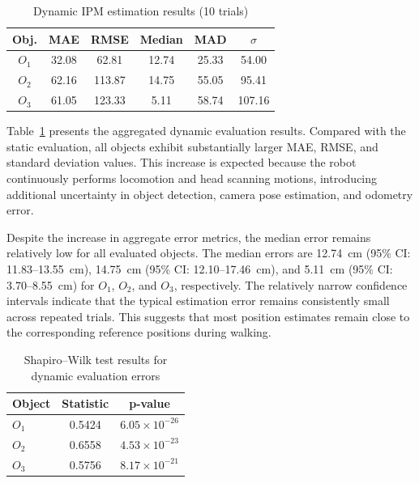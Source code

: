 \documentclass[journal]{IAENGtran}
\begin{document}
\begin{table}[h]
\centering
\footnotesize
\caption{Dynamic IPM estimation results (10 trials)}
\label{tab:dynamic_results}
\begin{tabular}{c c c c c c}
\toprule
\textbf{Obj.} &
\textbf{MAE} &
\textbf{RMSE} &
\textbf{Median} &
\textbf{MAD} &
\textbf{$\sigma$} \\
\midrule
$O_1$ & 32.08 & 62.81  & 12.74 & 25.33 & 54.00  \\
$O_2$ & 62.16 & 113.87 & 14.75 & 55.05 & 95.41  \\
$O_3$ & 61.05 & 123.33 & 5.11  & 58.74 & 107.16 \\
\bottomrule
\end{tabular}
\end{table}

Table~\ref{tab:dynamic_results} presents the aggregated dynamic evaluation
results. Compared with the static evaluation, all objects exhibit substantially
larger MAE, RMSE, and standard deviation values. This increase is expected because
the robot continuously performs locomotion and head scanning motions, introducing
additional uncertainty in object detection, camera pose estimation, and odometry error.

Despite the increase in aggregate error metrics, the median error remains
relatively low for all evaluated objects. The median errors are
12.74~cm (95\% CI: 11.83--13.55~cm), 14.75~cm (95\% CI: 12.10--17.46~cm),
and 5.11~cm (95\% CI: 3.70--8.55~cm) for $O_1$, $O_2$, and $O_3$,
respectively. The relatively narrow confidence intervals indicate that
the typical estimation error remains consistently small across repeated
trials. This suggests that most position estimates remain close to the
corresponding reference positions during walking.

\begin{table}[!h]
\centering
\footnotesize
\caption{Shapiro--Wilk test results for dynamic evaluation errors}
\label{shapiro_wilk_test}
\begin{tabular}{lcc}
\toprule
\textbf{Object} & \textbf{Statistic} & \textbf{p-value} \\
\midrule
$O_1$ & 0.5424 & $6.05 \times 10^{-26}$ \\
$O_2$ & 0.6558 & $4.53 \times 10^{-23}$ \\
$O_3$ & 0.5756 & $8.17 \times 10^{-21}$ \\
\bottomrule
\end{tabular}
\end{table}
\end{document}
